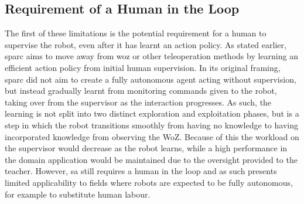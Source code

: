 \subsection{Requirement of a Human in the Loop}

The first of these limitations is the potential requirement for a human to supervise the robot, even after it has learnt an action policy. As stated earlier, \gls{sparc} aims to move away from \gls{woz} or other teleoperation methods by learning an efficient action policy from initial human supervision. In its original framing, \gls{sparc} did not aim to create a fully autonomous agent acting without supervision, but instead gradually learnt from monitoring commands given to the robot, taking over from the supervisor as the interaction progresses. As such, the learning is not split into two distinct exploration and exploitation phases, but is a step in which the robot transitions smoothly from having no knowledge to having incorporated knowledge from observing the WoZ. Because of this the workload on the supervisor would decrease as the robot learns, while a high performance in the domain application would be maintained due to the oversight provided to the teacher. However, \gls{sa} still requires a human in the loop and as such presents limited applicability to fields where robots are expected to be fully autonomous, for example to substitute human labour. 


